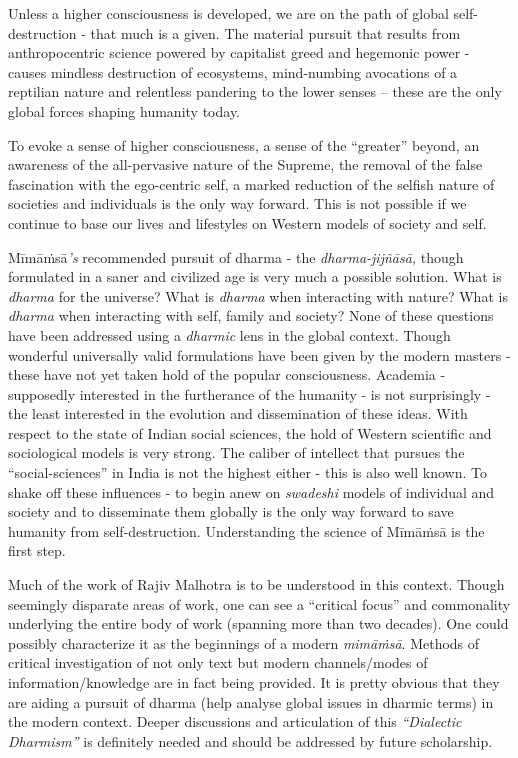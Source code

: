 Unless a higher consciousness is developed, we are on the path of global self-destruction - that much is a given. The material pursuit that results from anthropocentric science powered by capitalist greed and hegemonic power - causes mindless destruction of ecosystems, mind-numbing avocations of a reptilian nature and relentless pandering to the lower senses – these are the only global forces shaping humanity today.

To evoke a sense of higher consciousness, a sense of the “greater” beyond, an awareness of the all-pervasive nature of the Supreme, the removal of the false fascination with the ego-centric self, a marked reduction of the selfish nature of societies and individuals is the only way forward. This is not possible if we continue to base our lives and lifestyles on Western models of society and self.

Mīmāṁsā\textit{’s} recommended pursuit of dharma - the \textit{dharma-jijñāsā,} though formulated in a saner and civilized age is very much a possible solution. What is \textit{dharma} for the universe? What is \textit{dharma} when interacting with nature? What is \textit{dharma} when interacting with self, family and society? None of these questions have been addressed using a \textit{dharmic} lens in the global context. Though wonderful universally valid formulations have been given by the modern masters - these have not yet taken hold of the popular consciousness. Academia - supposedly interested in the furtherance of the humanity - is not surprisingly - the least interested in the evolution and dissemination of these ideas. With respect to the state of Indian social sciences, the hold of Western scientific and sociological models is very strong. The caliber of intellect that pursues the “social-sciences” in India is not the highest either - this is also well known. To shake off these influences - to begin anew on \textit{swadeshi} models of individual and society and to disseminate them globally is the only way forward to save humanity from self-destruction. Understanding the science of Mīmāṁsā is the first step.

Much of the work of Rajiv Malhotra is to be understood in this context. Though seemingly disparate areas of work, one can see a “critical focus” and commonality underlying the entire body of work (spanning more than two decades). One could possibly characterize it as the beginnings of a modern \textit{mimāṁsā}. Methods of critical investigation of not only text but modern channels/modes of information/knowledge are in fact being provided. It is pretty obvious that they are aiding a pursuit of dharma (help analyse global issues in dharmic terms) in the modern context. Deeper discussions and articulation of this \textit{“Dialectic Dharmism”} is definitely needed and should be addressed by future scholarship.


